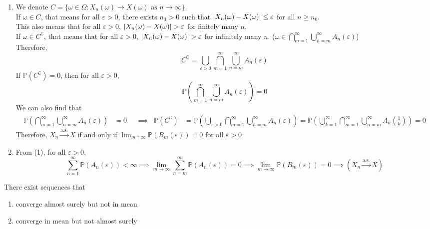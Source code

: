 \documentclass{huhtakm-template-book}
\newcommand{\prob}{\mathbb{P}}
\begin{document}
\begin{proofing}
	\begin{enumerate}
		\item We denote $C=\{\omega\in\Omega:X_{n}(\omega)\to X(\omega)\text{ as }n\to\infty\}$.\\
		If $\omega\in C$, that means for all $\varepsilon>0$, there exists $n_{0}>0$ such that $\left|{X_{n}(\omega)-X(\omega)}\right|\leq\varepsilon$ for all $n\geq n_{0}$.\\
		This also means that for all $\varepsilon>0$, $\abs{X_{n}(\omega)-X(\omega)}>\varepsilon$ for finitely many $n$.\\
		If $\omega\in C^{\complement}$, that means that for all $\varepsilon>0$, $\abs{X_{n}(\omega)-X(\omega)}>\varepsilon$ for infinitely many $n$. ($\omega\in\bigcap_{m=1}^{\infty}\bigcup_{n=m}^{\infty}A_{n}(\varepsilon)$)\\
		Therefore,
		\begin{equation*}
			C^{\complement}=\bigcup_{\varepsilon>0}\bigcap_{m=1}^{\infty}\bigcup_{n=m}^{\infty}A_{n}(\varepsilon)
		\end{equation*}
		If $\prob(C^{\complement})=0$, then for all $\varepsilon>0$,
		\begin{equation*}
			\prob\left(\bigcap_{m=1}^{\infty}\bigcup_{n=m}^{\infty}A_{n}(\varepsilon)\right)=0
		\end{equation*}
		We can also find that
		\begin{align*}
			\prob\left(\bigcap_{m=1}^{\infty}\bigcup_{n=m}^{\infty}A_{n}(\varepsilon)\right)&=0 & &\implies & \prob(C^{\complement})&=\prob\left(\bigcup_{\varepsilon>0}\bigcap_{m=1}^{\infty}\bigcup_{n=m}^{\infty}A_{n}(\varepsilon)\right)=\prob\left(\bigcup_{k=1}^{\infty}\bigcap_{m=1}^{\infty}\bigcup_{n=m}^{\infty}A_{n}\left(\frac{1}{k}\right)\right)=0
		\end{align*}
		Therefore, $X_{n}\xrightarrow{\text{a.s.}}X$ if and only if $\lim_{m\uparrow\infty}\prob(B_{m}(\varepsilon))=0$ for all $\varepsilon>0$
		\item From (1), for all $\varepsilon>0$,
		\begin{equation*}
			\sum_{n=1}^{\infty}\prob(A_{n}(\varepsilon))<\infty\implies\lim_{m\to\infty}\sum_{n=m}^{\infty}\prob(A_{n}(\varepsilon))=0\implies\lim_{m\to\infty}\prob(B_{m}(\varepsilon))=0\implies(X_{n}\xrightarrow{\text{a.s.}}X)
		\end{equation*}
	\end{enumerate}
\end{proofing}
\begin{lem}
	\label{Chapter 7 (Lemma) Non-relationship between almost surely convergence and mean}
	There exist sequences that
	\begin{enumerate}
		\item converge almost surely but not in mean
		\item converge in mean but not almost surely
	\end{enumerate}
\end{lem}
\end{document}
